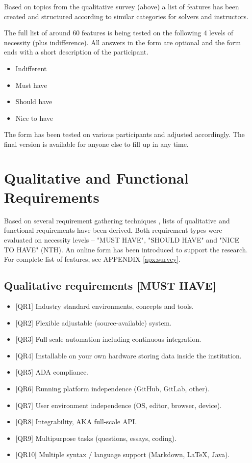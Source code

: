 {Based on topics from the qualitative survey (above) a list of features has been created and structured according to similar categories for solvers and instructors.}

{The full list of around 60 features is being tested on the following 4 levels of necessity (plus indifference). All answers in the form are optional and the form ends with a short description of the participant.}

\begin{itemize}
\item
  {Indifferent}
\item
  {Must have}
\item
  {Should have}
\item
  {Nice to have}
\end{itemize}

{The form has been tested on various participants and adjusted accordingly. The final version is available for anyone else to fill up in any time.}

\section{Qualitative and Functional Requirements} \label{sec:qual}

Based on several requirement gathering techniques \cite{young2002recommended}, lists of qualitative and functional requirements have been derived. Both requirement types were evaluated on necessity levels -- "MUST HAVE", "SHOULD HAVE" and "NICE TO HAVE" (NTH). An online form has been introduced to support the research. For complete list of features, see APPENDIX \ref{apx:survey}.

\subsection{Qualitative requirements {[}MUST HAVE{]}} \label{ssec:qual-must}

\begin{itemize}
\item
  {{[}QR1{]} Industry standard environments, concepts and tools.}
\item
  {{[}QR2{]} }{Flexible adjustable (source-available) system.}
\item
  {{[}QR3{]} Full-scale }{automation including continuous integration.}
\item
  {{[}QR4{]} }{Installable on your own hardware storing data inside the institution.}
\item
  {{[}QR5{]} ADA compliance.}
\item
  {{[}QR6{]} Running platform independence (GitHub, GitLab, other).}
\item
  {{[}QR7{]} User environment independence (OS, editor, browser, device).}
\item
  {{[}QR8{]} Integrability, AKA full-scale API.}
\item
  {{[}QR9{]} Multipurpose tasks (questions, essays, coding).}
\item
  {{[}QR10{]} Multiple syntax / language support (Markdown, LaTeX, Java).}
\end{itemize}

